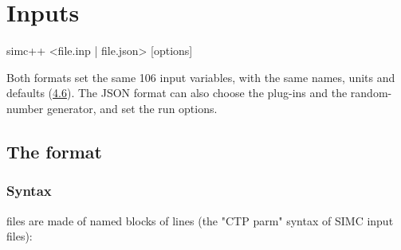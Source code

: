 \chapter{\texorpdfstring{Inputs}{Inputs}}\label{user_manual-04u5finputs}
\begin{simcplain}[basicstyle=\ttfamily\footnotesize]
simc++ <file.inp | file.json> [options]
\end{simcplain}
Both formats set the same 106 input variables, with the same names, units and defaults (\hyperref[user_manual-04u5finputs:46-parameter-reference]{4.6}).
The JSON format can also choose the plug-ins and the random-number generator, and set the run options.

\section{\texorpdfstring{The  format}{The .inp format}}\label{user_manual-04u5finputs:41-the-inp-format}
\subsection{\texorpdfstring{Syntax}{Syntax}}\label{user_manual-04u5finputs:411-syntax}
 files are made of named blocks of  lines (the "CTP parm" syntax of SIMC input files):

